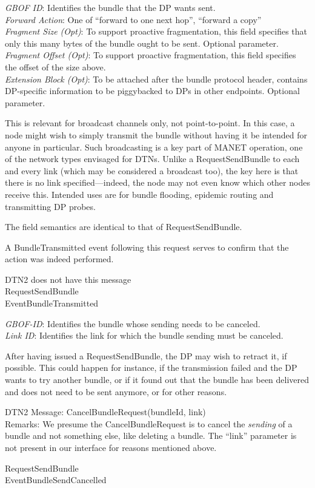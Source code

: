 {
\metP
    {\em GBOF ID}: Identifies the bundle that the DP wants sent.\\
    {\em Forward Action}: One of ``forward to one next hop'', ``forward a
    copy''\\
    {\em Fragment Size (Opt)}: To support proactive fragmentation, this field
    specifies that only this many bytes of the bundle ought to be sent.
    Optional parameter.\\
    {\em Fragment Offset (Opt)}: To support proactive fragmentation, this
    field specifies the offset of the size above.\\
    {\em Extension Block (Opt)}: To be attached after the bundle protocol
    header, contains DP-specific information to be piggybacked to DPs in other
    endpoints. Optional parameter.

\metD
    This is relevant for broadcast channels only, not point-to-point. In
    this case, a node might wish to simply transmit the bundle without having
    it be intended for anyone in particular. Such broadcasting is a key part
    of MANET operation, one of the network types envisaged for DTNs. Unlike
    a RequestSendBundle to each and every link (which may be considered a
    broadcast too), the key here is that there is no link specified---indeed,
    the node may not even know which other nodes receive this. Intended uses
    are for bundle flooding, epidemic routing and transmitting DP probes.

    The field semantics are identical to that of RequestSendBundle. 

    A BundleTransmitted event following this request serves to confirm that
    the action was indeed performed.

\metM
    DTN2 does not have this message\\

\metR
    RequestSendBundle\\
    EventBundleTransmitted\\
}

{
\metP
    {\em GBOF-ID}: Identifies the bundle whose sending needs to be canceled.\\
    {\em Link ID}: Identifies the link for which the bundle sending must be
    canceled.

\metD
    After having issued a RequestSendBundle, the DP may wish to retract it,
    if possible. This could happen for instance, if the transmission failed
    and the DP wants to try another bundle, or if it found out that the
    bundle has been delivered and does not need to be sent anymore, or  
    for other reasons. 

\metM
    DTN2 Message: CancelBundleRequest(bundleId, link)\\
    Remarks: We presume the CancelBundleRequest is to cancel the {\em sending}
    of a bundle and not something else, like deleting a bundle. The ``link''
    parameter is not present in our interface for reasons mentioned above.

\metR
    RequestSendBundle\\
    EventBundleSendCancelled
}

